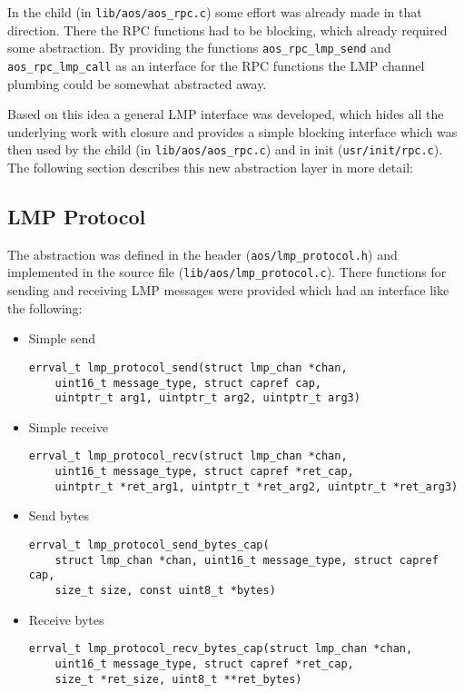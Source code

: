 In the child (in \verb|lib/aos/aos_rpc.c|) some effort was already made in that direction. There the RPC functions had to be blocking, which already required some abstraction. By providing the functions \verb|aos_rpc_lmp_send| and \verb|aos_rpc_lmp_call| as an interface for the RPC functions the LMP channel plumbing could be somewhat abstracted away.

Based on this idea a general LMP interface was developed, which hides all the underlying work with closure and provides a simple blocking interface which was then used by the child (in \verb|lib/aos/aos_rpc.c|) and in init (\verb|usr/init/rpc.c|). The following section describes this new abstraction layer in more detail:

\subsection{LMP Protocol}

The abstraction was defined in the header (\verb|aos/lmp_protocol.h|) and implemented in the source file (\verb|lib/aos/lmp_protocol.c|). There functions for sending and receiving LMP messages were provided which had an interface like the following:
\begin{itemize}
    \item Simple send
    \begin{verbatim}errval_t lmp_protocol_send(struct lmp_chan *chan,
    uint16_t message_type, struct capref cap,
    uintptr_t arg1, uintptr_t arg2, uintptr_t arg3)\end{verbatim}
    \item Simple receive
    \begin{verbatim}errval_t lmp_protocol_recv(struct lmp_chan *chan,
    uint16_t message_type, struct capref *ret_cap,
    uintptr_t *ret_arg1, uintptr_t *ret_arg2, uintptr_t *ret_arg3)\end{verbatim}
    \item Send bytes
    \begin{verbatim}errval_t lmp_protocol_send_bytes_cap(
    struct lmp_chan *chan, uint16_t message_type, struct capref cap,
    size_t size, const uint8_t *bytes)\end{verbatim}
    \item Receive bytes
    \begin{verbatim}errval_t lmp_protocol_recv_bytes_cap(struct lmp_chan *chan,
    uint16_t message_type, struct capref *ret_cap,
    size_t *ret_size, uint8_t **ret_bytes)\end{verbatim}
\end{itemize}

